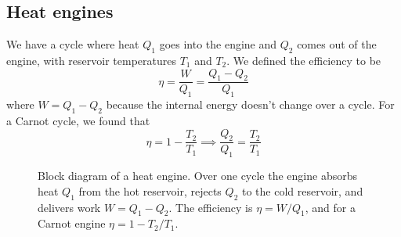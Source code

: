 \documentclass{report}
\numberwithin{equation}{section}
\begin{document}
\subsection{Heat engines} We have a cycle where heat $Q_1$ goes into the engine and $Q_2$ comes out of the engine, with reservoir temperatures $T_1$ and $T_2$. We defined the efficiency to be
\begin{equation*}
    \eta = \frac{W}{Q_1} = \frac{Q_1 - Q_2}{Q_1}
\end{equation*}
where $W = Q_1 - Q_2$ because the internal energy doesn't change over a cycle. For a Carnot cycle, we found that
\begin{equation*}
    \eta = 1 - \frac{T_2}{T_1} \implies \frac{Q_2}{Q_1} = \frac{T_2}{T_1}
\end{equation*}

\begin{figure}[H]
\centering
{}
\caption{Block diagram of a heat engine. Over one cycle the engine absorbs
heat $Q_1$ from the hot reservoir, rejects $Q_2$ to the cold reservoir, and
delivers work $W = Q_1 - Q_2$. The efficiency is $\eta = W/Q_1$, and for a
Carnot engine $\eta = 1 - T_2/T_1$.}
\label{fig:heat_engine}
\end{figure}
\end{document}
